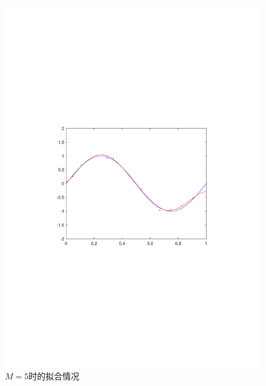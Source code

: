 \documentclass{article}
\begin{document}
\begin{homeworkProblem}
\begin{figure}[htbp]
		\begin{minipage}{0.49\linewidth}
			\centering
			\includegraphics[width=0.9\linewidth]{images/title/M=5.pdf}
			\caption{$M=5$时的拟合情况}
			\label{M=5}%
		\end{minipage}
		\begin{minipage}{0.49\linewidth}
			\centering

\end{minipage}
\end{figure}
\end{homeworkProblem}
\end{document}
